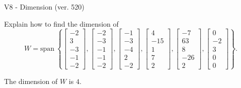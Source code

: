 \begin{exercise}
  \begin{exerciseTitle}V8 - Dimension (ver. 520)\end{exerciseTitle}
  \begin{exerciseStatement}
    Explain how to find the dimension of 
\[W=\mathrm{span}\ \left\{\left[\begin{array}{r}
-2 \\
3 \\
-3 \\
-1 \\
-2
\end{array}\right] , \left[\begin{array}{r}
-2 \\
-3 \\
-1 \\
-1 \\
-2
\end{array}\right] , \left[\begin{array}{r}
-1 \\
-3 \\
-4 \\
2 \\
-2
\end{array}\right] , \left[\begin{array}{r}
4 \\
-15 \\
1 \\
7 \\
2
\end{array}\right] , \left[\begin{array}{r}
-7 \\
63 \\
8 \\
-26 \\
2
\end{array}\right] , \left[\begin{array}{r}
0 \\
-2 \\
3 \\
0 \\
0
\end{array}\right]\right\}.\]



  \end{exerciseStatement}
  \begin{exerciseAnswer}
   The dimension of \(W\) is  \(4\).
  


  \end{exerciseAnswer}
\end{exercise}